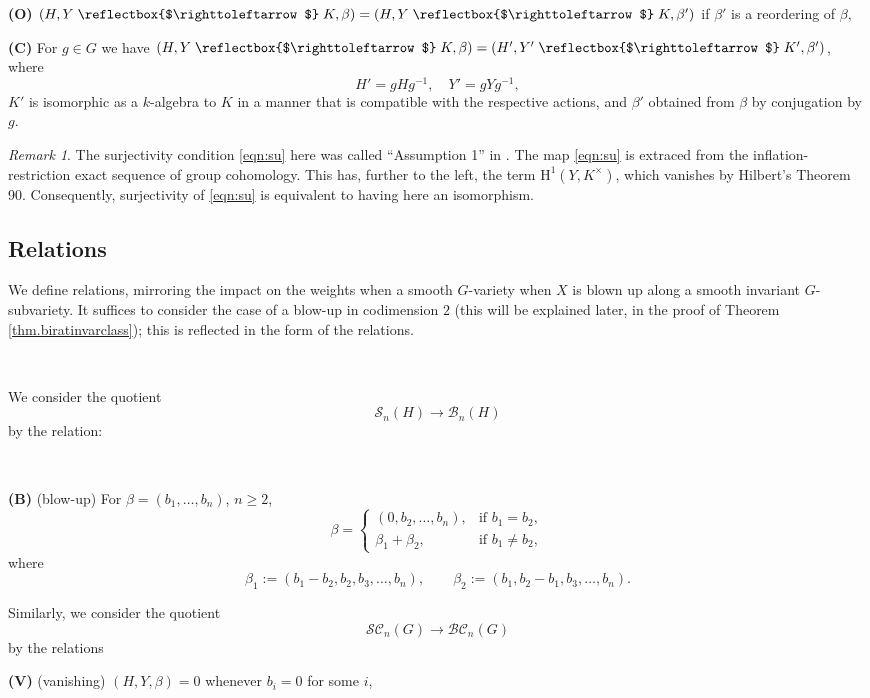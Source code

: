 \documentclass[12pt,reqno]{amsart}
\theoremstyle{plain}
\theoremstyle{remark}
\newtheorem{rema}[prop]{Remark}
\theoremstyle{definition}
\numberwithin{equation}{section}
\newcommand{\cB}{{\mathcal B}}
\newcommand{\cS}{{\mathcal S}}
\newcommand{\rH}{{\mathrm H}}
\newcommand{\actsfromleft}{\mathrel{\reflectbox{$\righttoleftarrow$}}}
\begin{document}
\noindent
\textbf{(O)} $(H, Y\actsfromleft K, \beta)=(H, Y\actsfromleft K, \beta')$ if $\beta'$ is a reordering of $\beta$,

\noindent
\textbf{(C)} For $g\in G$ we have $(H, Y\actsfromleft K, \beta)=(H', Y'\actsfromleft K', \beta')$, where
$$
H'=gHg^{-1}, \quad Y'=gYg^{-1},
$$
$K'$ is isomorphic as a $k$-algebra to $K$ in a manner that is compatible with the
respective actions,
and $\beta'$ obtained from $\beta$ by conjugation by $g$.

\begin{rema}
\label{rem.injective}
The surjectivity condition \eqref{eqn:su} here was called ``Assumption 1'' in \cite{BnG}.
The map \eqref{eqn:su} is extraced from the
inflation-restriction exact sequence of group cohomology.
This has, further to the left, the term
$\rH^1(Y,K^\times)$, which vanishes by Hilbert's Theorem 90.
Consequently, surjectivity of \eqref{eqn:su} is equivalent
to having here an isomorphism.
\end{rema}


\subsection{Relations}
\label{ss.relations}
We define relations, mirroring the impact on the weights when a smooth $G$-variety when $X$ is blown up along a smooth invariant $G$-subvariety.
It suffices to consider the case of a blow-up in codimension $2$ (this will be explained later, in the proof of Theorem \ref{thm.biratinvarclass}); this is reflected in the form of the relations.

\

We consider the quotient 
$$
\cS_n(H) \to \cB_n(H)
$$
by the relation:


\

\textbf{(B)} (blow-up) For $\beta=(b_1,\dots,b_n)$, $n\ge 2$,
\[ 
\beta=\begin{cases}
(0,b_2,\dots,b_n),&
\text{if $b_1=b_2$}, \\
\beta_1+\beta_2,&
\text{if $b_1\ne b_2$},
\end{cases}
\]
where
\[
\beta_1:=(b_1-b_2,b_2,b_3,\dots,b_n),\qquad
\beta_2:=(b_1,b_2-b_1,b_3,\dots,b_n).
\]

\medskip

Similarly, we consider the quotient
$$
\mathcal{SC}_n(G) \to \mathcal{BC}_n(G)
$$
by the relations

\noindent
\textbf{(V)} (vanishing) $(H,Y,\beta)=0$ whenever $b_i=0$ for some $i$, 
\end{document}
